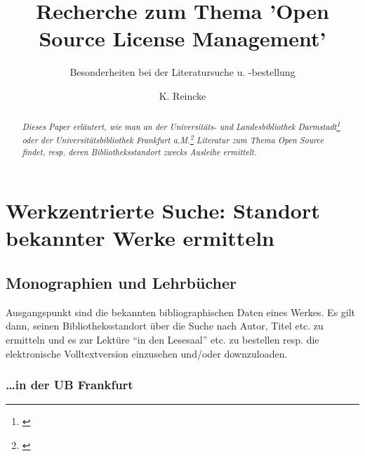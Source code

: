 \documentclass[DIV=calc,BCOR=5mm,11pt,headings=small,oneside,abstract=false, toc=bib]{scrartcl}
\begin{document}
\nocite{*}

\titlehead{\textbf{O}pen \textbf{S}ource \textbf{Li}cense \textbf{C}ompendium}
\subject{Die Uni-Bibliotheken DA und FaM}
\title{Recherche zum Thema 'Open Source License Management'}
\subtitle{Besonderheiten bei der Literatursuche u. -bestellung}
\author{K. Reincke}
\maketitle

\begin{abstract}
\noindent \itshape
Dieses Paper erläutert, wie man an der \emph{Universitäts- und Landesbibliothek
Darmstadt}\footnote{\cite[s.][]{UlbDaHome}} oder der
\emph{Universitätsbibliothek Frankfurt a.M.}\footnote{\cite[s.][]{UbFaMHome}}
Literatur zum Thema \emph{Open Source} findet, resp. deren Bibliotheksstandort
zwecks Ausleihe ermittelt.
\end{abstract}

\footnotesize
\tableofcontents
\normalsize

\section{Werkzentrierte Suche: Standort bekannter Werke ermitteln}

\subsection{Monographien und Lehrbücher}

Ausgangspunkt sind die bekannten bibliographischen Daten eines Werkes. Es gilt
dann, seinen Bibliotheksstandort über die Suche nach Autor, Titel etc. zu
ermitteln und es zur Lektüre \enquote{in den Lesesaal} etc. zu bestellen
resp. die elektronische Volltextversion einzusehen und/oder downzuloaden.

\subsubsection{\ldots in der UB Frankfurt}
\end{document}
